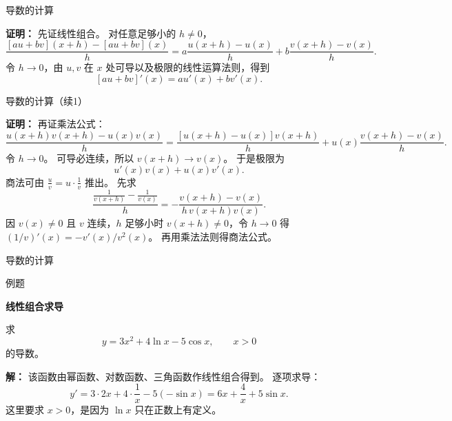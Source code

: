 \documentclass[aspectratio=169,10pt,fontset=fandol]{ctexbeamer}
\begin{document}
\begin{frame}[t,fragile]{导数的计算}
\footnotesize
{\footnotesize
\textbf{证明：}
先证线性组合。 对任意足够小的 $h\neq0$，
\[
\frac{[au+bv](x+h)-[au+bv](x)}{h}
=a\frac{u(x+h)-u(x)}{h}
+b\frac{v(x+h)-v(x)}{h}.
\]
令 $h\to0$，由 $u,v$ 在 $x$ 处可导以及极限的线性运算法则，得到
\[
[au+bv]'(x)=au'(x)+bv'(x).
\]


}
\end{frame}
\begin{frame}[t,fragile]{导数的计算（续1）}
\footnotesize
{\footnotesize
\textbf{证明：}
再证乘法公式：
\[
\frac{u(x+h)v(x+h)-u(x)v(x)}{h}
=\frac{[u(x+h)-u(x)]v(x+h)}{h}+u(x)\frac{v(x+h)-v(x)}{h}.
\]
令 $h\to0$。 可导必连续，所以 $v(x+h)\to v(x)$。 于是极限为
\[
u'(x)v(x)+u(x)v'(x).
\]
商法可由 $\frac{u}{v}=u\cdot\frac1v$ 推出。 先求
\[
\frac{\frac1{v(x+h)}-\frac1{v(x)}}{h}
=-\frac{v(x+h)-v(x)}{h\,v(x+h)v(x)}.
\]
因 $v(x)\neq0$ 且 $v$ 连续，$h$ 足够小时 $v(x+h)\neq0$，令 $h\to0$ 得 $(1/v)'(x)=-v'(x)/v^2(x)$。 再用乘法法则得商法公式。

}
\end{frame}
\begin{frame}[t,fragile]{导数的计算}
\normalsize
\begin{block}{例题}
{\normalsize
\textbf{线性组合求导}\par

求
\[
y=3x^2+4\ln x-5\cos x,\qquad x>0
\]
的导数。

}
\end{block}
\pause
{\normalsize
\textbf{解：}
该函数由幂函数、对数函数、三角函数作线性组合得到。 逐项求导：
\[
y'=3\cdot 2x+4\cdot\frac1x-5(-\sin x)
=6x+\frac4x+5\sin x.
\]
这里要求 $x>0$，是因为 $\ln x$ 只在正数上有定义。

}
\end{frame}
\end{document}
